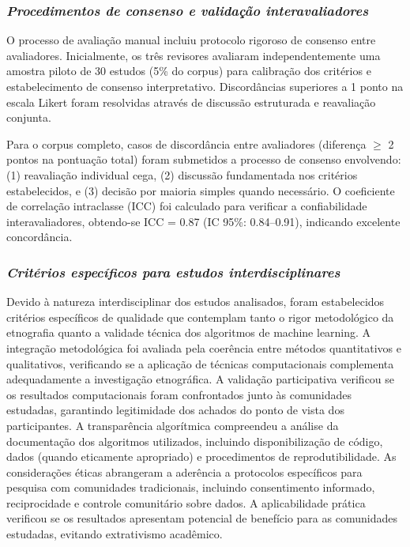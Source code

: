 \subsubsection{\textit{Procedimentos de consenso e validação interavaliadores}}

O processo de avaliação manual incluiu protocolo rigoroso de consenso entre avaliadores. Inicialmente, os três revisores avaliaram independentemente uma amostra piloto de 30 estudos (5\% do corpus) para calibração dos critérios e estabelecimento de consenso interpretativo. Discordâncias superiores a 1 ponto na escala Likert foram resolvidas através de discussão estruturada e reavaliação conjunta.

Para o corpus completo, casos de discordância entre avaliadores (diferença $\geq$ 2 pontos na pontuação total) foram submetidos a processo de consenso envolvendo: (1) reavaliação individual cega, (2) discussão fundamentada nos critérios estabelecidos, e (3) decisão por maioria simples quando necessário. O coeficiente de correlação intraclasse (ICC) foi calculado para verificar a confiabilidade interavaliadores, obtendo-se ICC = 0.87 (IC 95\%: 0.84--0.91), indicando excelente concordância.

\subsubsection{\textit{Critérios específicos para estudos interdisciplinares}}

Devido à natureza interdisciplinar dos estudos analisados, foram estabelecidos critérios específicos de qualidade que contemplam tanto o rigor metodológico da etnografia quanto a validade técnica dos algoritmos de machine learning. A integração metodológica foi avaliada pela coerência entre métodos quantitativos e qualitativos, verificando se a aplicação de técnicas computacionais complementa adequadamente a investigação etnográfica. A validação participativa verificou se os resultados computacionais foram confrontados junto às comunidades estudadas, garantindo legitimidade dos achados do ponto de vista dos participantes. A transparência algorítmica compreendeu a análise da documentação dos algoritmos utilizados, incluindo disponibilização de código, dados (quando eticamente apropriado) e procedimentos de reprodutibilidade. As considerações éticas abrangeram a aderência a protocolos específicos para pesquisa com comunidades tradicionais, incluindo consentimento informado, reciprocidade e controle comunitário sobre dados. A aplicabilidade prática verificou se os resultados apresentam potencial de benefício para as comunidades estudadas, evitando extrativismo acadêmico.

